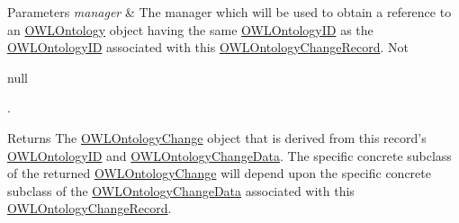 \begin{DoxyParams}{Parameters}
{\em manager} & The manager which will be used to obtain a reference to an \hyperlink{}{O\-W\-L\-Ontology} object having the same \hyperlink{}{O\-W\-L\-Ontology\-I\-D} as the \hyperlink{}{O\-W\-L\-Ontology\-I\-D} associated with this \hyperlink{classorg_1_1semanticweb_1_1owlapi_1_1change_1_1_o_w_l_ontology_change_record}{O\-W\-L\-Ontology\-Change\-Record}. Not
\begin{DoxyCode}
null 
\end{DoxyCode}
 .\\
\hline
\end{DoxyParams}
\begin{DoxyReturn}{Returns}
The \hyperlink{}{O\-W\-L\-Ontology\-Change} object that is derived from this record's \hyperlink{}{O\-W\-L\-Ontology\-I\-D} and \hyperlink{classorg_1_1semanticweb_1_1owlapi_1_1change_1_1_o_w_l_ontology_change_data}{O\-W\-L\-Ontology\-Change\-Data}. The specific concrete subclass of the returned \hyperlink{}{O\-W\-L\-Ontology\-Change} will depend upon the specific concrete subclass of the \hyperlink{classorg_1_1semanticweb_1_1owlapi_1_1change_1_1_o_w_l_ontology_change_data}{O\-W\-L\-Ontology\-Change\-Data} associated with this \hyperlink{classorg_1_1semanticweb_1_1owlapi_1_1change_1_1_o_w_l_ontology_change_record}{O\-W\-L\-Ontology\-Change\-Record}.
\end{DoxyReturn}

